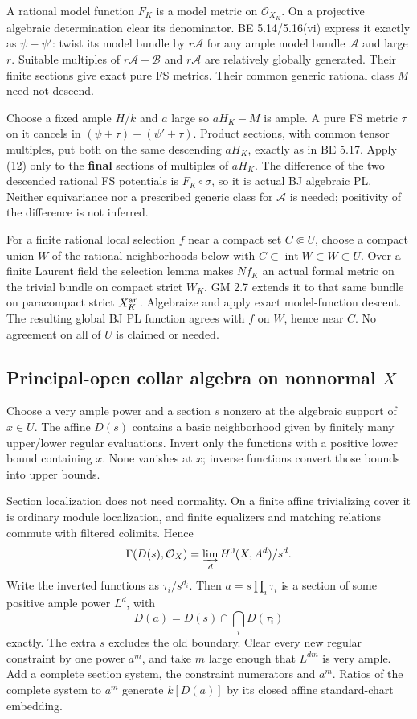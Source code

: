 \documentclass[
  10pt,
]{article}
\begin{document}
A rational model function \(F_K\) is a model metric on
\(\mathcal O_{X_K}\). On a projective algebraic determination clear its
denominator. BE 5.14/5.16(vi) express it exactly as \(\psi-\psi'\):
twist its model bundle by \(r\mathcal A\) for any ample model bundle
\(\mathcal A\) and large \(r\). Suitable multiples of
\(r\mathcal A+\mathcal B\) and \(r\mathcal A\) are relatively globally
generated. Their finite sections give exact pure FS metrics. Their
common generic rational class \(M\) need not descend.

Choose a fixed ample \(H/k\) and \(a\) large so \(aH_K-M\) is ample. A
pure FS metric \(\tau\) on it cancels in \((\psi+\tau)-(\psi'+\tau)\).
Product sections, with common tensor multiples, put both on the same
descending \(aH_K\), exactly as in BE 5.17. Apply (12) only to the
\textbf{final} sections of multiples of \(aH_K\). The difference of the
two descended rational FS potentials is \(F_K\circ\sigma\), so it is
actual BJ algebraic PL. Neither equivariance nor a prescribed generic
class for \(\mathcal A\) is needed; positivity of the difference is not
inferred.

For a finite rational local selection \(f\) near a compact set
\(C\Subset U\), choose a compact union \(W\) of the rational
neighborhoods below with
\(C\subset\operatorname{int}W\subset W\subset U\). Over a finite Laurent
field the selection lemma makes \(Nf_K\) an actual formal metric on the
trivial bundle on compact strict \(W_K\). GM 2.7 extends it to that same
bundle on paracompact strict \(X_K^{\rm an}\). Algebraize and apply
exact model-function descent. The resulting global BJ PL function agrees
with \(f\) on \(W\), hence near \(C\). No agreement on all of \(U\) is
claimed or needed.

\subsection{\texorpdfstring{Principal-open collar algebra on nonnormal
\(X\)}{Principal-open collar algebra on nonnormal X}}\label{principal-open-collar-algebra-on-nonnormal-x}

Choose a very ample power and a section \(s\) nonzero at the algebraic
support of \(x\in U\). The affine \(D(s)\) contains a basic neighborhood
given by finitely many upper/lower regular evaluations. Invert only the
functions with a positive lower bound containing \(x\). None vanishes at
\(x\); inverse functions convert those bounds into upper bounds.

Section localization does not need normality. On a finite affine
trivializing cover it is ordinary module localization, and finite
equalizers and matching relations commute with filtered colimits. Hence
\[\Gamma(D(s),\mathcal O_X)=\varinjlim_d H^0(X,A^d)/s^d.\] Write the
inverted functions as \(\tau_i/s^{d_i}\). Then \(a=s\prod_i\tau_i\) is a
section of some positive ample power \(L^d\), with
\[D(a)=D(s)\cap\bigcap_iD(\tau_i)\] exactly. The extra \(s\) excludes
the old boundary. Clear every new regular constraint by one power
\(a^m\), and take \(m\) large enough that \(L^{dm}\) is very ample. Add
a complete section system, the constraint numerators and \(a^m\). Ratios
of the complete system to \(a^m\) generate \(k[D(a)]\) by its closed
affine standard-chart embedding.
\end{document}
